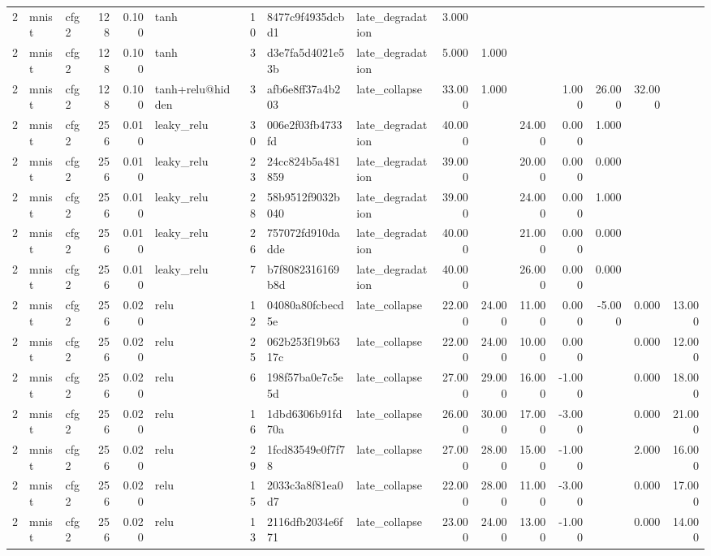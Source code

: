 \begin{table}[htbp]
{\begin{tabular}{@{}rllrrlrllrrrrrrr@{}}
2 & mnist & cfg2 & 128 & 0.100 & tanh & 10 & 8477c9f4935dcbd1 & late\_degradation & 3.000 &  &  &  &  &  &  \\
2 & mnist & cfg2 & 128 & 0.100 & tanh & 3 & d3e7fa5d4021e53b & late\_degradation & 5.000 & 1.000 &  &  &  &  &  \\
2 & mnist & cfg2 & 128 & 0.100 & tanh+relu@hidden & 3 & afb6e8ff37a4b203 & late\_collapse & 33.000 & 1.000 &  & 1.000 & 26.000 & 32.000 &  \\
2 & mnist & cfg2 & 256 & 0.010 & leaky\_relu & 30 & 006e2f03fb4733fd & late\_degradation & 40.000 &  & 24.000 & 0.000 & 1.000 &  &  \\
2 & mnist & cfg2 & 256 & 0.010 & leaky\_relu & 23 & 24cc824b5a481859 & late\_degradation & 39.000 &  & 20.000 & 0.000 & 0.000 &  &  \\
2 & mnist & cfg2 & 256 & 0.010 & leaky\_relu & 28 & 58b9512f9032b040 & late\_degradation & 39.000 &  & 24.000 & 0.000 & 1.000 &  &  \\
2 & mnist & cfg2 & 256 & 0.010 & leaky\_relu & 26 & 757072fd910dadde & late\_degradation & 40.000 &  & 21.000 & 0.000 & 0.000 &  &  \\
2 & mnist & cfg2 & 256 & 0.010 & leaky\_relu & 7 & b7f8082316169b8d & late\_degradation & 40.000 &  & 26.000 & 0.000 & 0.000 &  &  \\
2 & mnist & cfg2 & 256 & 0.020 & relu & 12 & 04080a80fcbecd5e & late\_collapse & 22.000 & 24.000 & 11.000 & 0.000 & -5.000 & 0.000 & 13.000 \\
2 & mnist & cfg2 & 256 & 0.020 & relu & 25 & 062b253f19b6317c & late\_collapse & 22.000 & 24.000 & 10.000 & 0.000 &  & 0.000 & 12.000 \\
2 & mnist & cfg2 & 256 & 0.020 & relu & 6 & 198f57ba0e7c5e5d & late\_collapse & 27.000 & 29.000 & 16.000 & -1.000 &  & 0.000 & 18.000 \\
2 & mnist & cfg2 & 256 & 0.020 & relu & 16 & 1dbd6306b91fd70a & late\_collapse & 26.000 & 30.000 & 17.000 & -3.000 &  & 0.000 & 21.000 \\
2 & mnist & cfg2 & 256 & 0.020 & relu & 29 & 1fcd83549e0f7f78 & late\_collapse & 27.000 & 28.000 & 15.000 & -1.000 &  & 2.000 & 16.000 \\
2 & mnist & cfg2 & 256 & 0.020 & relu & 15 & 2033c3a8f81ea0d7 & late\_collapse & 22.000 & 28.000 & 11.000 & -3.000 &  & 0.000 & 17.000 \\
2 & mnist & cfg2 & 256 & 0.020 & relu & 13 & 2116dfb2034e6f71 & late\_collapse & 23.000 & 24.000 & 13.000 & -1.000 &  & 0.000 & 14.000 \\

\end{tabular}}
\end{table}
